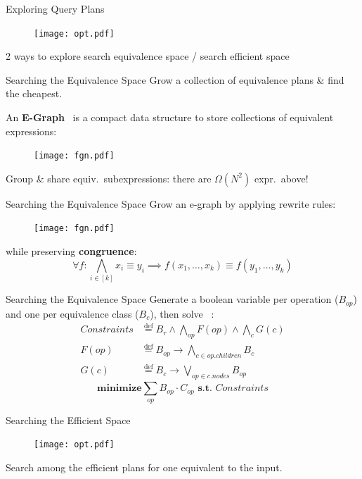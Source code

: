 \documentclass{beamer}
\newcommand{\deq}{\stackrel{\text{def}}{=}}
\begin{document}
  \begin{frame}{Exploring Query Plans}
    \begin{figure}
      \texttt{[image: opt.pdf]}
    \end{figure}
    2 ways to explore search equivalence space / search efficient space
  \end{frame}

  \begin{frame}{Searching the Equivalence Space}
    Grow a collection of equivalence plans \& find the cheapest. \pause

    An \textbf{E-Graph}~\cite{eqsat} is a compact data structure to store collections 
    of equivalent expressions:
    \begin{figure}
      \texttt{[image: fgn.pdf]}
    \end{figure}
    Group \& share equiv.~subexpressions: there are $\Omega(N^2)$ expr.~above!
  \end{frame}

  \begin{frame}{Searching the Equivalence Space}
    Grow an e-graph by applying rewrite rules:
    \begin{figure}
      \texttt{[image: fgn.pdf]}
    \end{figure}
    while preserving \textbf{congruence}: 
    \[\forall f : \bigwedge_{i \in [k]} x_i \equiv y_i \implies f(x_1, \ldots, x_k ) \equiv f(y_1, \ldots, y_k)\]
  \end{frame}

  \begin{frame}{Searching the Equivalence Space}
    Generate a boolean variable per operation ($B_{op}$) and 
    one per equivalence class ($B_{c}$), then solve~\cite{eqsat} :
    \begin{align*}
      Constraints &\deq B_r \wedge \bigwedge_{op} F(op) \wedge \bigwedge_c G(c)
      \\ F(op) &\deq B_{op} \rightarrow \bigwedge_{c \in op.children} B_c \\ G(c)
      &\deq B_c \rightarrow \bigvee_{op \in c.nodes} B_{op}
      \end{align*}
      \[\textbf{minimize} \sum_{op} B_{op} \cdot C_{op} \textbf{ s.t. } Constraints\]
  \end{frame}

  \begin{frame}{Searching the Efficient Space}
    \begin{figure}
      \texttt{[image: opt.pdf]}
    \end{figure}
    Search among the efficient plans for one equivalent to the input.
  \end{frame}
\end{document}
